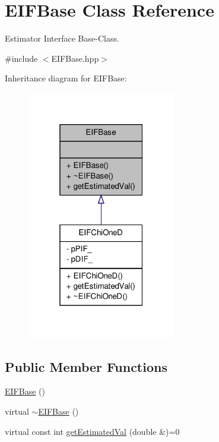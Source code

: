 \hypertarget{classEIFBase}{
\section{EIFBase Class Reference}
\label{df/d13/classEIFBase}
}


Estimator Interface Base-\/Class.  




{\ttfamily \#include $<$EIFBase.hpp$>$}



Inheritance diagram for EIFBase:
\nopagebreak
\begin{figure}[H]
\begin{center}
\leavevmode
\includegraphics[width=184pt]{d7/d7a/classEIFBase__inherit__graph}
\end{center}
\end{figure}
\subsection*{Public Member Functions}
\begin{DoxyCompactItemize}
\item 
\hyperlink{classEIFBase_a8b6ea6ef6b90d40293b55a71249cb5f0}{EIFBase} ()
\item 
virtual \hyperlink{classEIFBase_ae4253811072d1d4251a009bda238f450}{$\sim$EIFBase} ()
\item 
virtual const int \hyperlink{classEIFBase_af98fe883244454497c421bc824b96188}{getEstimatedVal} (double \&)=0
\end{DoxyCompactItemize}


